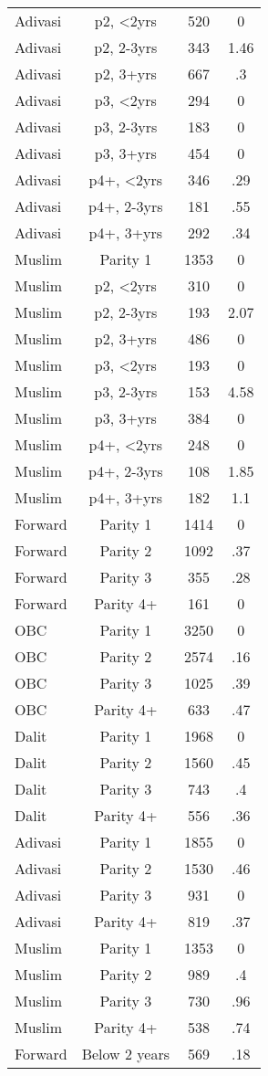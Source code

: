 \begin{tabular}{lccc}
Adivasi&p2, <2yrs&520&0\\
Adivasi&p2, 2-3yrs&343&1.46\\
Adivasi&p2, 3+yrs&667&.3\\
Adivasi&p3, <2yrs&294&0\\
Adivasi&p3, 2-3yrs&183&0\\
Adivasi&p3, 3+yrs&454&0\\
Adivasi&p4+, <2yrs&346&.29\\
Adivasi&p4+, 2-3yrs&181&.55\\
Adivasi&p4+, 3+yrs&292&.34\\
Muslim&Parity 1&1353&0\\
Muslim&p2, <2yrs&310&0\\
Muslim&p2, 2-3yrs&193&2.07\\
Muslim&p2, 3+yrs&486&0\\
Muslim&p3, <2yrs&193&0\\
Muslim&p3, 2-3yrs&153&4.58\\
Muslim&p3, 3+yrs&384&0\\
Muslim&p4+, <2yrs&248&0\\
Muslim&p4+, 2-3yrs&108&1.85\\
Muslim&p4+, 3+yrs&182&1.1\\
Forward&Parity 1&1414&0\\
Forward&Parity 2&1092&.37\\
Forward&Parity 3&355&.28\\
Forward&Parity 4+&161&0\\
OBC&Parity 1&3250&0\\
OBC&Parity 2&2574&.16\\
OBC&Parity 3&1025&.39\\
OBC&Parity 4+&633&.47\\
Dalit&Parity 1&1968&0\\
Dalit&Parity 2&1560&.45\\
Dalit&Parity 3&743&.4\\
Dalit&Parity 4+&556&.36\\
Adivasi&Parity 1&1855&0\\
Adivasi&Parity 2&1530&.46\\
Adivasi&Parity 3&931&0\\
Adivasi&Parity 4+&819&.37\\
Muslim&Parity 1&1353&0\\
Muslim&Parity 2&989&.4\\
Muslim&Parity 3&730&.96\\
Muslim&Parity 4+&538&.74\\
Forward&Below 2 years&569&.18\\

\end{tabular}

